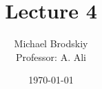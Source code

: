 


\title{Lecture 4}
\date{\today}
\author{Michael Brodskiy\\ \small Professor: A. Ali}



\maketitle

